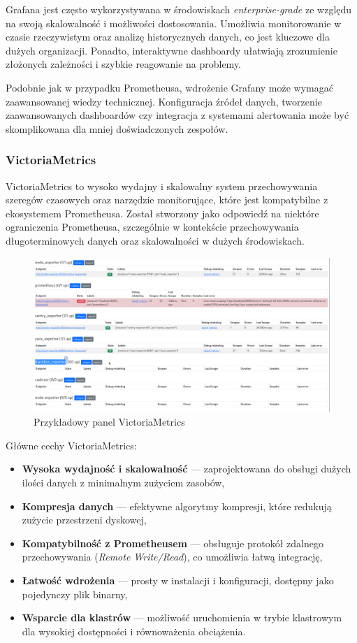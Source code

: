 \documentclass{article}
\begin{document}
Grafana jest często wykorzystywana w środowiskach \textit{enterprise-grade} ze względu na swoją skalowalność i możliwości dostosowania. Umożliwia monitorowanie w czasie rzeczywistym oraz analizę historycznych danych, co jest kluczowe dla dużych organizacji. Ponadto, interaktywne dashboardy ułatwiają zrozumienie złożonych zależności i szybkie reagowanie na problemy.

Podobnie jak w przypadku Prometheusa, wdrożenie Grafany może wymagać zaawansowanej wiedzy technicznej. Konfiguracja źródeł danych, tworzenie zaawansowanych dashboardów czy integracja z systemami alertowania może być skomplikowana dla mniej doświadczonych zespołów.

\subsubsection{VictoriaMetrics}

VictoriaMetrics to wysoko wydajny i skalowalny system przechowywania szeregów czasowych oraz narzędzie monitorujące, które jest kompatybilne z ekosystemem Prometheusa. Został stworzony jako odpowiedź na niektóre ograniczenia Prometheusa, szczególnie w kontekście przechowywania długoterminowych danych oraz skalowalności w dużych środowiskach.

\begin{figure}[H]
    \centering
    \includegraphics[width=1\linewidth]{victoriaMetricsPrzyklad.png}
    \caption{Przykładowy panel VictoriaMetrics}
    \label{fig:enter-label}
\end{figure}

Główne cechy VictoriaMetrics:

\begin{itemize}
    \item \textbf{Wysoka wydajność i skalowalność} — zaprojektowana do obsługi dużych ilości danych z minimalnym zużyciem zasobów,
    \item \textbf{Kompresja danych} — efektywne algorytmy kompresji, które redukują zużycie przestrzeni dyskowej,
    \item \textbf{Kompatybilność z Prometheusem} — obsługuje protokół zdalnego przechowywania (\textit{Remote Write/Read}), co umożliwia łatwą integrację,
    \item \textbf{Łatwość wdrożenia} — prosty w instalacji i konfiguracji, dostępny jako pojedynczy plik binarny,
    \item \textbf{Wsparcie dla klastrów} — możliwość uruchomienia w trybie klastrowym dla wysokiej dostępności i równoważenia obciążenia.
\end{itemize}
\end{document}
